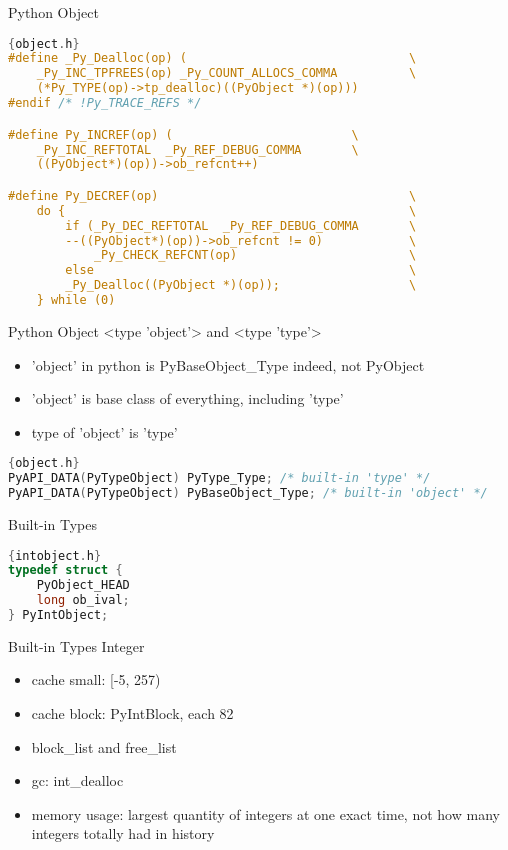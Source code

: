 \documentclass[xcolor=svgnames]{beamer}
\begin{document}
\begin{frame}[fragile]{Python Object}
    \begin{lstlisting}[language=C]{object.h}
#define _Py_Dealloc(op) (                               \
    _Py_INC_TPFREES(op) _Py_COUNT_ALLOCS_COMMA          \
    (*Py_TYPE(op)->tp_dealloc)((PyObject *)(op)))
#endif /* !Py_TRACE_REFS */

#define Py_INCREF(op) (                         \
    _Py_INC_REFTOTAL  _Py_REF_DEBUG_COMMA       \
    ((PyObject*)(op))->ob_refcnt++)

#define Py_DECREF(op)                                   \
    do {                                                \
        if (_Py_DEC_REFTOTAL  _Py_REF_DEBUG_COMMA       \
        --((PyObject*)(op))->ob_refcnt != 0)            \
            _Py_CHECK_REFCNT(op)                        \
        else                                            \
        _Py_Dealloc((PyObject *)(op));                  \
    } while (0)
\end{lstlisting} 
\end{frame}


\begin{frame}[fragile]{Python Object}
    <type 'object'> and <type 'type'>
    \begin{itemize}
        \item 'object' in python is PyBaseObject\_Type indeed, not PyObject
        \item 'object' is base class of everything, including 'type'
        \item type of 'object' is 'type'
    \end{itemize}
    \begin{lstlisting}[language=C]{object.h}
PyAPI_DATA(PyTypeObject) PyType_Type; /* built-in 'type' */
PyAPI_DATA(PyTypeObject) PyBaseObject_Type; /* built-in 'object' */
    \end{lstlisting} 
\end{frame}

\begin{frame}[fragile]{Built-in Types}
\begin{lstlisting}[language=C]{intobject.h}
typedef struct {
    PyObject_HEAD
    long ob_ival;
} PyIntObject;
\end{lstlisting} 
\end{frame}

\begin{frame}{Built-in Types}
Integer
\begin{itemize} 
    \item cache small: [-5, 257)
  \pause
  \item cache block: PyIntBlock, each 82
  \pause 
  \item block\_list and free\_list
  \pause 
  \item gc: int\_dealloc
  \pause
  \item memory usage: largest quantity of integers at one exact time, not how many integers totally had in history
\end{itemize}
\end{frame}
\end{document}
